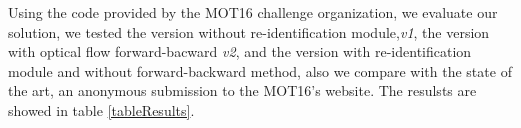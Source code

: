 Using the code provided by the MOT16 challenge organization, we evaluate our solution, we tested the version without re-identification module,\textit{v1}, the version with optical flow forward-bacward \textit{v2}, and the version with re-identification module and without forward-backward method, also we compare with the state of the art, an anonymous submission to the MOT16's website. The resulsts are showed in table \ref{tableResults}.


%


